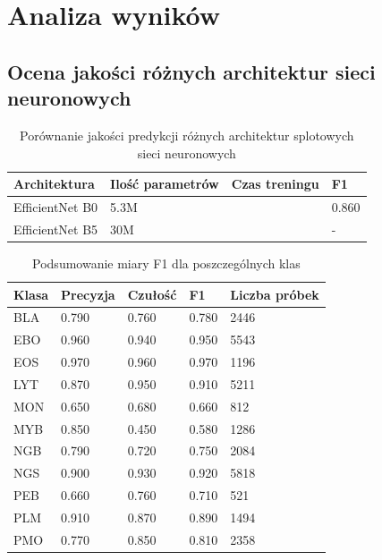 \chapter{Analiza wyników}

\section{Ocena jakości różnych architektur sieci neuronowych}

\begin{table}
    \caption{Porównanie jakości predykcji różnych architektur splotowych sieci neuronowych}
    \begin{center}
        \begin{tabular}{|l|l|l|l|}
            \hline
            Architektura & Ilość parametrów & Czas treningu & F1 \\
            \hline
            EfficientNet B0 & 5.3M &  & 0.860 \\
            \hline
            EfficientNet B5 & 30M &  & - \\
            \hline
        \end{tabular}
    \end{center}
    \label{tab:comparison}
\end{table}


\begin{table}
    \caption{Podsumowanie miary F1 dla poszczególnych klas}
    \begin{center}
        \begin{tabular}{|l|l|l|l|l|}
            \hline
            Klasa & Precyzja & Czułość & F1 & Liczba próbek \\
            \hline
            BLA & 0.790 & 0.760 & 0.780 & 2446 \\
            \hline
            EBO & 0.960 & 0.940 & 0.950 & 5543 \\
            \hline
            EOS & 0.970 & 0.960 & 0.970 & 1196 \\
            \hline
            LYT & 0.870 & 0.950 & 0.910 & 5211 \\
            \hline
            MON & 0.650 & 0.680 & 0.660 & 812 \\
            \hline
            MYB & 0.850 & 0.450 & 0.580 & 1286 \\
            \hline
            NGB & 0.790 & 0.720 & 0.750 & 2084 \\
            \hline
            NGS & 0.900 & 0.930 & 0.920 & 5818 \\
            \hline
            PEB & 0.660 & 0.760 & 0.710 & 521 \\
            \hline
            PLM & 0.910 & 0.870 & 0.890 & 1494 \\
            \hline
            PMO & 0.770 & 0.850 & 0.810 & 2358 \\
            \hline
        \end{tabular}
    \end{center}
    \label{tab:f1_summary}
\end{table}

